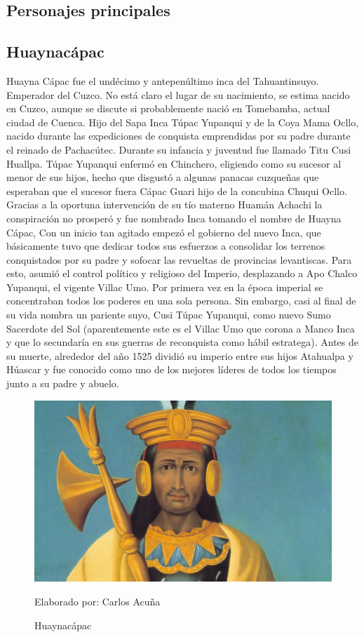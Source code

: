 \documentclass[a4paper, openright, 12pt]{report}
\begin{document}
\subsection*{Personajes principales}
\subsection*{Huaynacápac}
\justify
Huayna Cápac fue el undécimo y antepenúltimo inca del Tahuantinsuyo. Emperador del Cuzco. No está claro el lugar de su nacimiento, se estima nacido en Cuzco, aunque se discute si probablemente nació en Tomebamba, actual ciudad de Cuenca. Hijo del Sapa Inca Túpac Yupanqui y de la Coya Mama Ocllo, nacido durante las expediciones de conquista emprendidas por su padre durante el reinado de Pachacútec. Durante su infancia y juventud fue llamado Titu Cusi Huallpa.
Túpac Yupanqui enfermó en Chinchero, eligiendo como su sucesor al menor de sus hijos, hecho que disgustó a algunas panacas cuzqueñas que esperaban que el sucesor fuera Cápac Guari hijo de la concubina Chuqui Ocllo. Gracias a la oportuna intervención de su tío materno Huamán Achachi la conspiración no prosperó y fue nombrado Inca tomando el nombre de Huayna Cápac, Con un inicio tan agitado empezó el gobierno del nuevo Inca, que básicamente tuvo que dedicar todos sus esfuerzos a consolidar los terrenos conquistados por su padre y sofocar las revueltas de provincias levantiscas. Para esto, asumió el control político y religioso del Imperio, desplazando a Apo Chalco Yupanqui, el vigente Villac Umo. Por primera vez en la época imperial se concentraban todos los poderes en una sola persona. Sin embargo, casi al final de su vida nombra un pariente suyo, Cusi Túpac Yupanqui, como nuevo Sumo Sacerdote del Sol (aparentemente este es el Villac Umo que corona a Manco Inca y que lo secundaría en sus guerras de reconquista como hábil estratega).
Antes de su muerte, alrededor del año 1525 dividió su imperio entre sus hijos Atahualpa y Húascar y fue conocido como uno de los mejores líderes de todos los tiempos junto a su padre y abuelo. \cite{de2006enciclopedia}

\begin{figure}[h]
\captionsetup{justification=centering,margin=2cm}
\includegraphics[scale=0.4]{h2}
\centering
\caption{Huaynacápac}
Elaborado por: Carlos Acuña
\label{fig:h2}
\end{figure}
\clearpage
\end{document}
